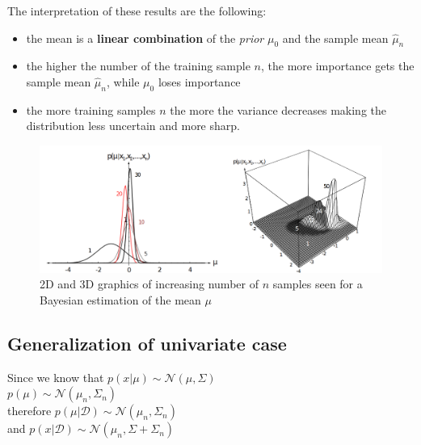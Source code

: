 The interpretation of these results are the following:
\begin{itemize}
	\item the mean is a \textbf{linear combination} of the \textit{prior} $\mu_{0}$
		and the sample mean $\hat{\mu}_{n}$

	\item the higher the number of the training sample $n$, the more importance
		gets the sample mean $\hat{\mu}_{n}$, while $\mu_{0}$ loses importance

	\item the more training samples $n$ the more the variance decreases making the
		distribution less uncertain and more sharp.
\end{itemize}

\begin{figure}[H]
	\centering
	\includegraphics[scale=0.3]{
		images/07_ParameterEstimation_bayesianEstimation.png
	}
	\caption{2D and 3D graphics of increasing number of $n$ samples seen for a
	Bayesian estimation of the mean $\mu$}
	\label{fig:bayesian_mean_estimate}
\end{figure}


\subsection{Generalization of univariate case}
Since we know that $p(x|\mu) \sim \mathcal{N}(\mu, \Sigma)$\\ $p(\mu) \sim \mathcal{N}
(\mu_{n}, \Sigma_{n})$\\ therefore
$p(\mu|\mathcal{D}) \sim \mathcal{N}(\mu_{n}, \Sigma_{n})$\\ and $p(x|\mathcal{D}
) \sim \mathcal{N}(\mu_{n}, \Sigma + \Sigma_{n})$
\vspace{2cm}

